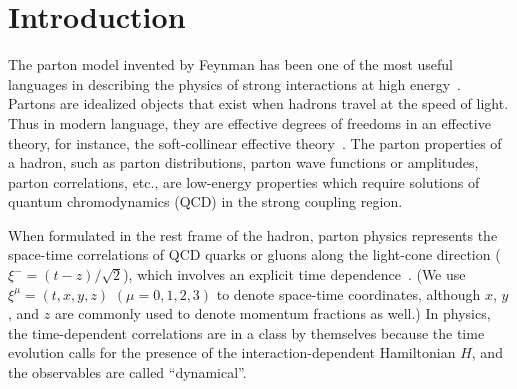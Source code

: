 \section{Introduction}
\label{intro}

The parton model invented by Feynman has been one of the most useful languages in describing the physics
of strong interactions at high energy~\cite{Feynman:1969ej}. Partons are idealized objects that exist when
hadrons travel at the speed of light. Thus in modern language, they are effective degrees of
freedoms in an effective theory, for instance, the soft-collinear
effective theory~\cite{Bauer:2000yr}.
The parton properties of a hadron, such as parton distributions, parton
wave functions or amplitudes, parton correlations, etc., are low-energy properties which
require solutions of quantum chromodynamics (QCD) in the strong coupling region.

When formulated in the rest frame of the hadron, parton physics represents
the space-time correlations of QCD quarks or gluons along the light-cone direction ($\xi^-=(t-z)/\sqrt{2}$),
which involves an explicit time dependence~\cite{Sterman:1994ce}.
(We use $\xi^\mu = (t, x, y, z)$ $(\mu=0,1,2,3)$ to denote space-time coordinates, although $x$, $y$, and $z$ are commonly used to
denote momentum fractions as well.)
In physics, the time-dependent
correlations are in a class by themselves because the time evolution calls for the presence of the
interaction-dependent Hamiltonian $H$, and the observables are called ``dynamical''.


